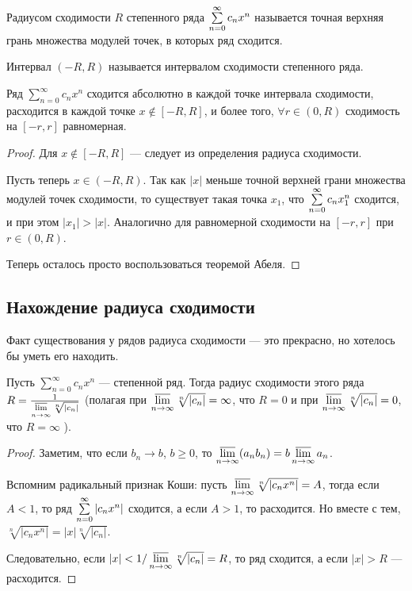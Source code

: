 \begin{Def}
	Радиусом сходимости $R$ степенного ряда $\sum\limits_{n=0}^{\infty} c_nx^n$ называется точная верхняя грань множества модулей точек, в которых ряд сходится.
\end{Def}

\begin{Def}
Интервал $(-R, R)$ называется интервалом сходимости степенного ряда.
\end{Def}

\begin{Consequence}
	Ряд  $\sum\limits_{n = 0}^{\infty}c_n x^n$ сходится абсолютно в каждой точке интервала сходимости, расходится в каждой точке $x \not\in [-R, R]$, и более того, $\forall r \in (0, R)$ сходимость на $[-r, r]$ равномерная.
\end{Consequence}
\begin{proof}
Для $x \not \in [-R, R]$ --- следует из определения радиуса сходимости.

Пусть теперь $x \in (-R, R)$. Так как $|x|$ меньше точной верхней грани множества модулей точек сходимости, то существует такая точка $x_1$, что $\sum\limits_{n=0}^{\infty} c_nx_1^n$ сходится, и при этом $|x_1| > |x|$. Аналогично для равномерной сходимости на $[-r, r]$  при $r \in (0, R)$.

Теперь осталось просто воспользоваться теоремой Абеля.
\end{proof}

\subsection{Нахождение радиуса сходимости}

Факт существования у рядов радиуса сходимости --- это прекрасно, но хотелось бы уметь его находить.


\begin{Theorem} 
	Пусть $\sum\limits_{n = 0}^{\infty}c_n x^n$  --- степенной ряд. Тогда радиус сходимости этого ряда $R= \frac{1}{\varlimsup\limits_{n \to \infty} \sqrt[n]{|c_n|}}$ (полагая при $\varlimsup\limits_{n \to \infty} \sqrt[n]{|c_n|} = \infty$, что $R = 0$ и при $\varlimsup\limits_{n \to \infty} \sqrt[n]{|c_n|} = 0$, что $R = \infty$ ).
\end{Theorem}
\begin{proof}
	Заметим, что если $b_n \to b$, $b \geq 0$, то $\varlimsup\limits_{n \to \infty} (a_nb_n) = b\varlimsup\limits_{n \to \infty} a_n$.
	
	Вспомним радикальный признак Коши: пусть $\varlimsup\limits_{n \to \infty} \sqrt[n]{|c_nx^n|} = A$, тогда если $A < 1$, то ряд $\sum\limits_{n=0}^{\infty} |c_nx^n|$ сходится, а если $A > 1$, то расходится. Но вместе с тем, $\sqrt[n]{|c_nx^n|} = |x|\sqrt[n]{|c_n|}$.
	
	Следовательно, если $|x| < 1 / \varlimsup\limits_{n \to \infty} \sqrt[n]{|c_n|} = R$, то ряд сходится, а если $|x| > R$ --- расходится.
\end{proof}

